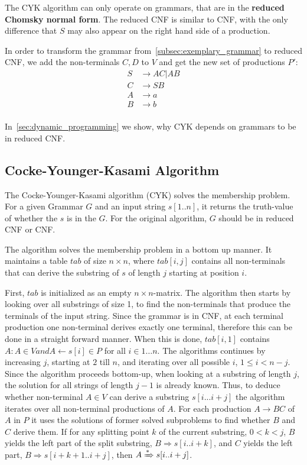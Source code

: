 The CYK algorithm can only operate on grammars, that are in the \textbf{reduced Chomsky normal form}.
The reduced CNF is similar to CNF, with the only difference that $S$ may also appear on the right hand side of a production.

In order to transform the grammar from~\ref{subsec:exemplary_grammar} to reduced CNF, we add the non-terminals $C,D$ to $V$ and get the new set of productions $P'$:
\begin{align*}
    S&\rightarrow AC | AB \\
    C&\rightarrow SB \\
    A&\rightarrow a \\
    B&\rightarrow b \\
\end{align*}

In~\ref{sec:dynamic_programming} we show, why CYK depends on grammars to be in reduced CNF.

\subsection{Cocke-Younger-Kasami Algorithm}

The Cocke-Younger-Kasami algorithm (CYK) solves the membership problem.
For a given Grammar $G$ and an input string $s[1..n]$, it returns the truth-value of whether the $s$ is in the $G$.
For the original algorithm, $G$ should be in reduced CNF or CNF.

The algorithm solves the membership problem in a bottom up manner.
It maintains a table $tab$ of size $n\times n$, where $tab[i,j]$ contains all non-terminals that can derive the substring of $s$ of length $j$ starting at position $i$.

First, $tab$ is initialized as an empty $n\times n$-matrix.
The algorithm then starts by looking over all substrings of size 1, to find the non-terminals that produce the terminals of the input string.
Since the grammar is in CNF, at each terminal production one non-terminal derives exactly one terminal, therefore this can be done in a straight forward manner.
When this is done, $tab[i,1]$ contains ${A: A\in V and A\leftarrow s[i] \in P}$ for all $i\in {1\dots n}$.
The algorithms continues by increasing $j$, starting at $2$ till $n$, and iterating over all possible $i$, $1\leq i < n-j$.
Since the algorithm proceeds bottom-up, when looking at a substring of length $j$, the solution for all strings of length $j-1$ is already known.
Thus, to deduce whether non-terminal $A\in V$ can derive a substring $s[i...i+j]$ the algorithm iterates over all non-terminal productions of $A$.
For each production $A\rightarrow BC$ of $A$ in $P$ it uses the solutions of former solved subproblems to find whether $B$ and $C$ derive them.
If for any splitting point $k$ of the current substring, $0 < k < j$, $B$ yields the left part of the split substring, $B\Rightarrow s[i..i+k]$, and $C$ yields the left part, $B\Rightarrow s[i+k+1..i+j]$, then $A\xRightarrow{*} s[i..i+j]$.

